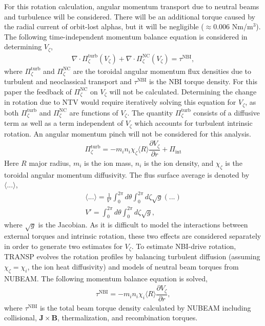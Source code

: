\documentclass[aip, pop, preprint]{revtex4-1}
\numberwithin{figure}{section}
\numberwithin{equation}{section}
\newcommand{\partder}[2]{\dfrac{\partial  #1}{\partial  #2}} %
\begin{document}
For this rotation calculation, angular momentum transport due to neutral beams and turbulence will be considered. There will be an additional torque caused by the radial current of orbit-lost alphas,\cite{Rosenbluth1996} but it will be negligible ($\approx 0.006$ Nm/m$^3$). The following time-independent momentum balance equation is considered in determining $V_{\zeta}$,
\begin{gather}
\nabla \cdot \Pi_{\zeta}^{\text{turb}}(V_{\zeta}) + \nabla \cdot \Pi_{\zeta}^{\text{NC}}(V_{\zeta}) = \tau^{\text{NBI}},
\end{gather}
where $\Pi^{\text{turb}}_{\zeta}$ and $\Pi^{\text{NC}}_{\zeta}$ are the toroidal angular momentum flux densities due to turbulent and neoclassical transport and $\tau^{\text{NBI}}$ is the NBI torque density. For this paper the feedback of $\Pi_{\zeta}^{\text{NC}}$ on $V_{\zeta}$ will not be calculated. Determining the change in rotation due to NTV would require iteratively solving this equation for $V_{\zeta}$, as both $\Pi_{\zeta}^{\text{turb}}$ and $\Pi_{\zeta}^{\text{NC}}$ are functions of $V_{\zeta}$. The quantity $\Pi_{\zeta}^{\text{turb}}$ consists of a diffusive term as well as a term independent of $V_{\zeta}$ which accounts for turbulent intrinsic rotation. An angular momentum pinch will not be considered for this analysis. 
\begin{gather}
\Pi_{\zeta}^{\text{turb}} = -m_i n_i \chi_{\zeta} \langle R \rangle\partder{V_{\zeta}}{r} + \Pi_{\text{int}}
\end{gather}
Here $R$ major radius, $m_i$ is the ion mass, $n_i$ is the ion density, and $\chi_{\zeta}$ is the toroidal angular momentum diffusivity. The flus surface average is denoted by $\langle ... \rangle$,
\begin{gather}
\langle ... \rangle = \frac{1}{V'} \int_0^{2 \pi} d \theta \int_0^{2 \pi} d \zeta \sqrt{g} (...)
\\ V' = \int_0^{2\pi} d \theta \int_0^{2 \pi} d \zeta \sqrt{g},
\end{gather}
where $\sqrt{g}$ is the Jacobian. As it is difficult to model the interactions between external torques and intrinsic rotation, these two effects are considered separately in order to generate two estimates for $V_{\zeta}$. To estimate NBI-drive rotation, TRANSP evolves the rotation profiles by balancing turbulent diffusion (assuming $\chi_{\zeta} = \chi_{i}$, the ion heat diffusivity) and models of neutral beam torques from NUBEAM. The following momentum balance equation is solved,
\begin{gather}
\tau^{\text{NBI}} = -m_i n_i \chi_{i} \langle R \rangle \partder{V_{\zeta}}{r},
\end{gather}
where $\tau^{\text{NBI}}$ is the total beam torque density calculated by NUBEAM including collisional, $\bm{J} \times \bm{B}$, thermalization, and recombination torques.
\end{document}
